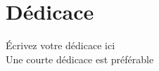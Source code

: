 \chapter*{\hfill Dédicace \hfill}


\vspace{3cm}

\begin{center}
Écrivez votre dédicace ici\\
Une courte dédicace est préférable

\end{center}